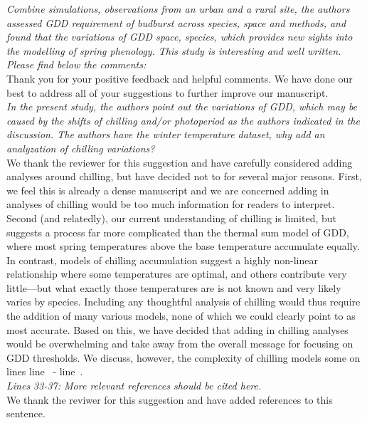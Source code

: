 \documentclass[11pt,a4paper]{article}\usepackage[]{graphicx}\usepackage[]{color}
\newcommand{\lr}[1]{line~\lineref{#1}}
\begin{document}
\textit{Combine simulations, observations from an urban and a rural site, the authors assessed GDD requirement of budburst across species, space and methods, and found that the variations of GDD space, species, which provides new sights into the modelling of spring phenology. This study is interesting and well written. Please find below the comments:} \\

Thank you for your positive feedback and helpful comments. We have done our best to address all of your suggestions to further improve our manuscript. \\

\textit{In the present study, the authors point out the variations of GDD, which may be caused by the shifts of chilling and/or photoperiod as the authors indicated in the discussion. The authors have the winter temperature dataset, why add an analyzation of chilling variations?} \\

We thank the reviewer for this suggestion and have carefully considered adding analyses around chilling, but have decided not to for several major reasons. First, we feel this is already a dense manuscript and we are concerned adding in analyses of chilling would be too much information for readers to interpret. Second (and relatedly), our current understanding of chilling is limited, but suggests a process far more complicated than the thermal sum model of GDD, where most spring temperatures above the base temperature accumulate equally. In contrast, models of chilling accumulation suggest a highly non-linear relationship where some temperatures are optimal, and others contribute very little---but what exactly those temperatures are is not known and very likely varies by species. Including any thoughtful analysis of chilling would thus require the addition of many various models, none of which we could clearly point to as most accurate. Based on this, we have decided that adding in chilling analyses would be overwhelming and take away from the overall message for focusing on GDD thresholds. We discuss, however, the complexity of chilling models some on lines \lr{Z2chillstart} - \lr{Z2chillend}.  \\  

\textit{Lines 33-37: More relevant references should be cited here.} \\

We thank the reviwer for this suggestion and have added references to this sentence. \\
\end{document}
